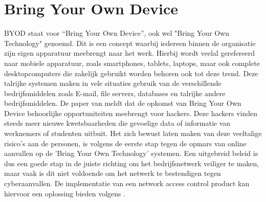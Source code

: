\section{Bring Your Own Device}
BYOD staat voor “Bring Your Own Device”, ook wel "Bring Your Own Technology" genoemd. Dit is een concept waarbij iedereen binnen de organisatie zijn eigen apparatuur meebrengt naar het werk. Hierbij wordt veelal gerefereerd naar mobiele apparatuur, zoals smartphones, tablets, laptops, maar ook complete desktopcomputers die zakelijk gebruikt worden behoren ook tot deze trend. Deze talrijke systemen maken in vele situaties gebruik van de verschillende bedrijfsmiddelen zoals E-mail, file servers, databases en talrijke andere bedrijfsmiddelen.
\newline
\newline
De paper van \cite{Zakiah2017} meldt dat de opkomst van Bring Your Own Device behoorlijke opportuniteiten meebrengt voor hackers. Deze hackers vinden steeds meer nieuwe kwetsbaarheden die gevoelige data of informatie van werknemers of studenten uitbuit. Het zich bewust laten maken van deze veeltalige risico's aan de personen, is volgens \cite{Zakiah2017} de eerste stap tegen de opmars van online aanvallen op de 'Bring Your Own Technology' systemen.
\newline
\newline
Een uitgebreid beleid is dus een goede stap in de juiste richting om het bedrijfsnetwerk veiliger te maken, maar vaak is dit niet voldoende om het netwerk te bestendigen tegen cyberaanvallen. De implementatie van een network access control product kan hiervoor een oplossing bieden volgens \cite{Zakiah2017}.

